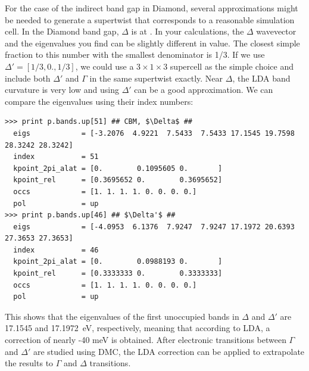 For the case of the indirect band gap in Diamond, several approximations might be needed to generate a supertwist that corresponds to a reasonable simulation cell. 
In the Diamond band gap, $\Delta$  is at \ishell{[0.3695653, 0., 0.3695653]}. 
In your calculations, the $\Delta$ wavevector and the eigenvalues you find can be slightly different in value. 
The closest simple fraction to this number with the smallest denominator is 1/3. If we use $\Delta'=[1/3, 0., 1/3]$, we could use a  $3\times1\times3$ supercell as the simple choice and include both $\Delta'$ and $\Gamma$ in the same supertwist exactly. 
Near  $\Delta$, the LDA band curvature is very low and using  $\Delta'$ can be a good approximation. 
We can compare the eigenvalues using their index numbers:
\begin{lstlisting}[mathescape=true,style=Python]
>>> print p.bands.up[51] ## CBM, $\Delta$ ##
  eigs            = [-3.2076  4.9221  7.5433  7.5433 17.1545 19.7598 28.3242 28.3242]
  index           = 51
  kpoint_2pi_alat = [0.        0.1095605 0.       ]
  kpoint_rel      = [0.3695652 0.        0.3695652]
  occs            = [1. 1. 1. 1. 0. 0. 0. 0.]
  pol             = up
>>> print p.bands.up[46] ## $\Delta'$ ##
  eigs            = [-4.0953  6.1376  7.9247  7.9247 17.1972 20.6393 27.3653 27.3653]
  index           = 46
  kpoint_2pi_alat = [0.        0.0988193 0.       ]
  kpoint_rel      = [0.3333333 0.        0.3333333]
  occs            = [1. 1. 1. 1. 0. 0. 0. 0.]
  pol             = up
\end{lstlisting}
This shows that the eigenvalues of the first unoccupied bands in $\Delta$ and $\Delta'$ are 17.1545 and 17.1972~eV, respectively, meaning that according to LDA, a correction of nearly -40 meV is obtained. 
After electronic transitions between $\Gamma$ and $\Delta'$ are studied using DMC, the LDA correction can be applied to extrapolate the results to $\Gamma$ and $\Delta$ transitions.

